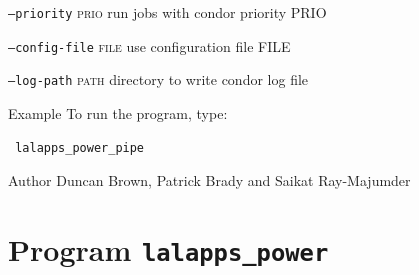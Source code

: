 \begin{entry}
\begin{entry}
\item[\texttt{--priority} \textsc{prio}] run jobs with condor priority PRIO

\item[\texttt{--config-file} \textsc{file}] use configuration file FILE

\item[\texttt{--log-path} \textsc{path}] directory to write condor log file
\end{entry}


\item[Example]
To run the program,  type:
\begin{verbatim}
 lalapps_power_pipe 
\end{verbatim}

\item[Author]
Duncan Brown, Patrick Brady and Saikat Ray-Majumder
\end{entry}
\clearpage


\clearpage
\section{Program \texttt{lalapps\_power}}
\label{program:lalapps-power}

